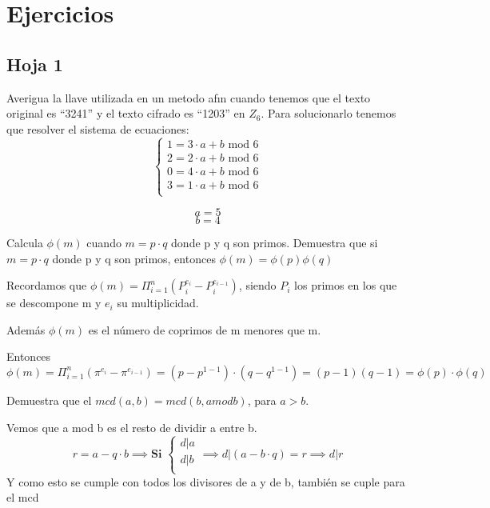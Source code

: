 \chapter{Ejercicios}
\section{Hoja 1}
\begin{problem}[11]
	 Averigua la llave utilizada en un metodo afın cuando tenemos que el
	 texto original es “3241” y el texto cifrado es “1203” en $Z_6$.
	\solution
	Para solucionarlo tenemos que resolver el sistema de ecuaciones:
	$$\begin{cases}
		1= 3\cdot a + b \text{ mod 6}\\
		2 = 2 \cdot a +b \text{ mod 6}\\
		0 = 4 \cdot a +b \text{ mod 6}\\
		3 = 1 \cdot a+b \text{ mod 6}\\
	\end{cases}$$
	
	$$a=5$$
	$$b=4$$
\end{problem}


\begin{problem}[24]
	Calcula $\phi(m)$ cuando $m = p · q$ donde p y q son primos. Demuestra que
	si $m = p · q$ donde p y q son primos, entonces $\phi(m) = \phi(p)\phi(q)$
	\solution
	
	Recordamos que $\phi(m) = \Pi_{i=1}^n (P_i^{e_i} - P_i^{e_{i-1}})$, siendo $P_i$ los primos en los que se descompone m y $e_i$ su multiplicidad.
	
	Además $\phi(m)$ es el número de coprimos de m menores que m.
	
	Entonces
	$$\phi(m) = \Pi_{i=1}^n (\pi^{e_i} - \pi^{e_{i-1}}) = (p-p^{1-1})\cdot(q-q^{1-1}) = (p-1)(q-1) = \phi(p)\cdot \phi(q)$$
\end{problem}

\begin{problem}[19]
	
	Demuestra que el $mcd(a, b) = mcd(b, a mod b)$, para $a > b$.
	
	\solution
	
	Vemos que a mod b es el resto de dividir a entre b.
	$$r = a-q\cdot b \implies \textbf{Si }\begin{cases}
	 d|a\\
	 d| b\\
	\end{cases} \implies d|(a-b\cdot q) = r \implies d|r$$
	Y como esto se cumple con todos los divisores de a y de b, también se cuple para el mcd
\end{problem}


